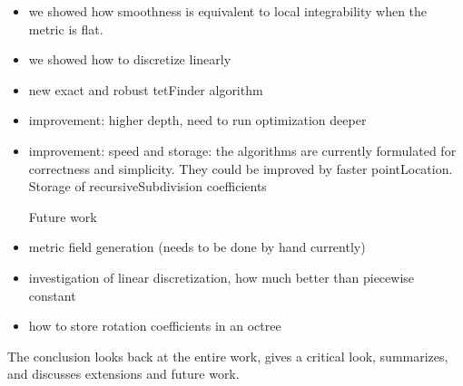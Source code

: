 \documentclass[a4paper,twoside,openright,11pt]{report}
\begin{document}
 



\begin{itemize}
  \item we showed how smoothness is equivalent to local integrability
  when the metric is flat.
  \item we showed how to discretize linearly
  \item new exact and robust tetFinder algorithm
  \item improvement: higher depth, need to run optimization deeper
  \item improvement: speed and storage: the algorithms are currently
  formulated for correctness and simplicity. They could be improved by
  faster pointLocation. Storage of recursiveSubdivision coefficients

  Future work
  \item metric field generation (needs to be done by hand currently)
  \item investigation of linear discretization, how much better than piecewise constant
  \item how to store rotation coefficients in an octree
\end{itemize}


The conclusion looks back at the entire work, gives a critical look,
summarizes, and discusses extensions and future work.


\nocite{*}



%
%
\end{document}
